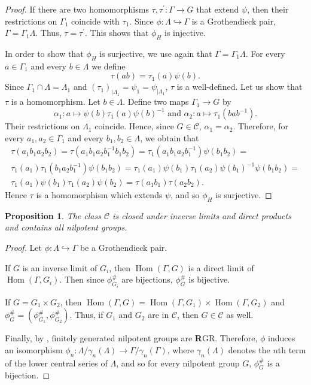 \documentclass{amsart}
\newtheorem{pro}[lem]{Proposition}
\theoremstyle{definition}
\theoremstyle{remark}
\DeclareMathOperator{\Hom}{Hom}
\begin{document}
\begin{proof}
If there are two homomorphisms $\tau, \tau^\prime: \Gamma\to G$ that extend $\psi$, then their restrictions on $\Gamma_1$ coincide with $\tau_1$. Since $\phi:\Lambda \hookrightarrow \Gamma$ is a Grothendieck pair, $\Gamma=\Gamma_1\Lambda$.  Thus,  $\tau=\tau^\prime$. This shows that $\phi_H$ is injective.

In order to show that $\phi_H$ is surjective, we use again that $\Gamma=\Gamma_1\Lambda$. For every  $a\in \Gamma_1$ and  every $b\in \Lambda$ we define 
$$\tau(ab)=\tau_1(a)\psi(b).$$ Since $\Gamma_1\cap \Lambda=\Lambda_1$ and $(\tau_1)_{|\Lambda_1}=\psi_1= \psi_{|\Lambda_1}$, $\tau$ is a well-defined. 
Let us show that $\tau$ is a  homomorphism.  Let  $b\in \Lambda$. Define two maps $\Gamma_1\to G$ by 
$$\alpha_1: a\mapsto \psi(b)\tau_1(a) \psi(b)^{-1}\textrm{\ and \ } \alpha_2: a\mapsto  \tau_1(bab^{-1}). $$
Their restrictions on $\Lambda_1$ coincide. Hence, since $G\in \mathcal C$, $\alpha_1=\alpha_2$. Therefore, for every  $a_1,a_2\in \Gamma_1$ and  every $b_1,b_2\in \Lambda$, we obtain that
\begin{multline*}
\tau(a_1b_1a_2b_2)=\tau(a_1b_1a_2b_1^{-1}b_1b_2)=\tau_1(a_1b_1a_2b_1^{-1})\psi(b_1b_2)=\\
\tau_1(a_1)\tau_1(b_1a_2b_1^{-1})\psi(b_1b_2)=\tau_1(a_1)\psi(b_1)\tau_1(a_2)\psi(b_1)^{-1}\psi(b_1b_2)=\\ \tau_1(a_1)\psi(b_1)\tau_1(a_2)\psi(b_2)=\tau(a_1b_1)\tau(a_2b_2).
\end{multline*}
Hence $\tau$ is a homomorphism which extends $\psi$,  and so $\phi_H$ is surjective.
\end{proof}
\begin{pro}\label{gr2}
The class $\mathcal C$ is closed under inverse limits and direct products and contains all nilpotent groups.
\end{pro}
\begin{proof} Let  $\phi:\Lambda \hookrightarrow \Gamma$ be a Grothendieck pair.

If $G$ is an inverse limit of $G_i$, then $\Hom (\Gamma, G)$ is a direct limit of $\Hom (\Gamma, G_i)$. Then since $\phi_{G_i}^{\#}$ are bijections, $\phi_{G}^{\#}$ is bijective.

If $G=G_1\times G_2$, then $\Hom (\Gamma, G)=\Hom (\Gamma, G_1)\times \Hom (\Gamma, G_2)$ and $\phi_G^{\#}=(\phi_{G_1}^{\#}, \phi_{G_2}^{\#})$. Thus, if $G_1$ and $G_2$ are in $\mathcal C$, then $G\in \mathcal C$ as well.

Finally, by \cite[Proposition 2]{PT90}, finitely generated nilpotent groups are {\textbf R}GR. Therefore,  $\phi$ induces an isomorphism $\phi_{n}:\Lambda/\gamma_n(\Lambda)\to \Gamma/\gamma_n(\Gamma)$, where $\gamma_n( \Lambda)$ denotes the $n$th term of the lower central series of $\Lambda$, and so for every nilpotent group $G$, $\phi_G^{\#}$ is a bijection.
\end{proof}
\end{document}
